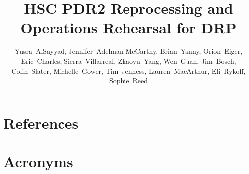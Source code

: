 \documentclass[OPS,authoryear,toc]{lsstdoc}
\title{HSC PDR2 Reprocessing and Operations Rehearsal for DRP}
\author{%
Yusra~AlSayyad, 
Jennifer~Adelman-McCarthy, 
Brian~Yanny, 
Orion~Eiger, 
Eric~Charles, 
Sierra~Villarreal, 
Zhaoyu~Yang, 
Wen~Guan, 
Jim~Bosch, 
Colin~Slater, 
Michelle~Gower, 
Tim~Jenness, 
Lauren~MacArthur, 
Eli~Rykoff,
Sophie~Reed
}
\date{\vcsDate}
\begin{document}
\maketitle



\appendix
\section{References} \label{sec:bib}
\renewcommand{\refname}{} %


\section{Acronyms} \label{sec:acronyms}

\end{document}
